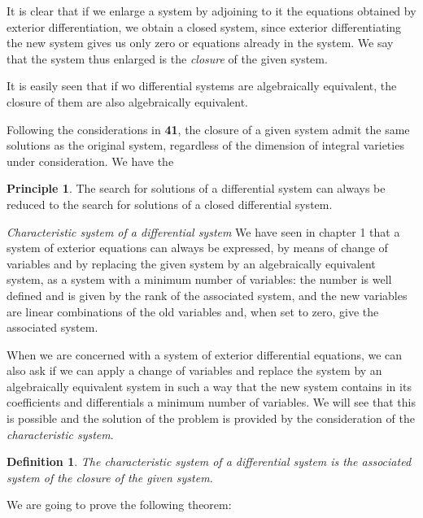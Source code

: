 \documentclass[leqno,11pt]{book}
\numberwithin{equation}{chapter}
\theoremstyle{shape1}
\newtheorem*{dfn*}{\hspace{15pt}Definition}
\theoremstyle{shape0}
\theoremstyle{shape2}
\theoremstyle{definition}
\begin{document}
It is clear that if we enlarge a system by adjoining to it the equations obtained by exterior differentiation, we obtain a closed system, since exterior differentiating the new system gives us only zero or equations already in the system. We say that the system thus enlarged is the \emph{closure} of the given system.

It is easily seen that if wo differential systems are algebraically equivalent, the closure of them are also algebraically equivalent.

Following the considerations in \textsection\textbf{41},  the  closure of a given system admit the same solutions as the original system, regardless of the dimension of integral varieties under consideration. We have the
\newtheorem*{prin*}{\hspace{15pt}Principle}
\begin{prin*}
  The search for  solutions of a differential system can always be reduced to the search for  solutions of a closed differential system.
\end{prin*}

\vspace{12pt}\fsec\emph{Characteristic system of a differential system} We have seen in chapter 1 that a system of exterior equations can always be expressed, by means of change of variables and by replacing the given system by an algebraically equivalent system, as a system with a minimum number of variables: the number is well defined and is given by the rank of the associated system, and the new variables are linear combinations of the old variables and, when set to zero, give the associated system.

When we are concerned with a system of exterior differential equations, we can also ask if we can apply a change of variables and replace the system by an algebraically equivalent system in such a way that the new system contains in its coefficients and differentials a minimum number of variables. We will see that this is possible and the solution of the problem is provided by the consideration of the \emph{characteristic system}.

\begin{dfn*}
  The characteristic system of a differential system is the associated system of the closure of the given system.
\end{dfn*}

We are going to prove the following theorem:
\end{document}
